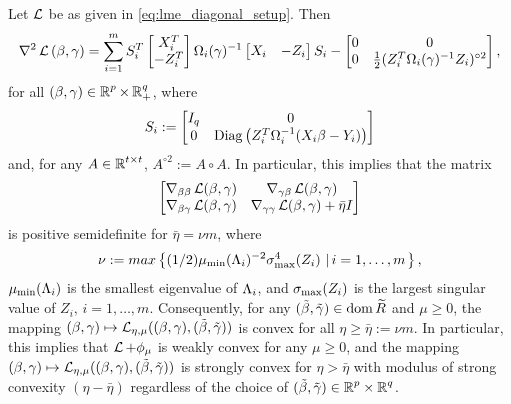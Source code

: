 \begin{lemma}\label{lem:LL weak cvx}
Let $\operatorname{\mathcal{L}}$ be as given in \eqref{eq:lme_diagonal_setup}. Then
\begin{equation}\label{eq:hess LL}
\nabla^2\operatorname{\mathcal{L}}{(\beta,\gamma)}=\sum_{i=1}^m
S_i^T\begin{bmatrix}X_i^T\\ -Z_i^T\end{bmatrix}
\Omega_i(\gamma)^{-1}
\begin{bmatrix}X_i& -Z_i\end{bmatrix}S_i
-\begin{bmatrix}
0&0\\ 0& \frac{1}{2}(Z_i^T\Omega_i(\gamma)^{-1}Z_i)^{\circ2}
\end{bmatrix},
\end{equation}
for all
$(\beta,\gamma)\in\operatorname{\mathbb{R}}^p\times\operatorname{\mathbb{R}}^q_+$, where 
\[
S_i:=\begin{bmatrix}
I_q&0\\ 0&\mathrm{Diag}\left(Z_i^T\Omega_i^{-1}(X_i\beta-Y_i)\right)
\end{bmatrix}
\]
and, for any $A\in\operatorname{\mathbb{R}}^{t\times t}$, $A^{\circ 2}:=A\circ A$. In particular, this implies
that the matrix
\begin{equation}\label{eq:psd for LL}
\begin{bmatrix}
\nabla_{\beta\beta}\operatorname{\mathcal{L}}(\beta,\gamma)&\nabla_{\gamma\beta}\operatorname{\mathcal{L}}(\beta,\gamma)\\
\nabla_{\beta\gamma}\operatorname{\mathcal{L}}(\beta,\gamma)&\nabla_{\gamma\gamma}\operatorname{\mathcal{L}}(\beta,\gamma)
+{\bar\eta} I\end{bmatrix}
\end{equation}
is positive semidefinite
for $\bar\eta= \nu m$, where
\[
\nu:=max\left\{(1/2) \mu_{\text{min}}(\Lambda_i)^{-2}\sigma^4_{\text{max}}(Z_i)\,\left|\,i=1,\dots,m\right.\right\},
\]
$\mu_{\text{min}}(\Lambda_i)$ is the smallest eigenvalue of $\Lambda_i$, and
 $\sigma_{\text{max}}(Z_i)$ is the largest singular value of $Z_i,\, i=1,\dots,m$.
Consequently, for any $(\tilde\beta,{\tilde{\gamma}})\in\operatorname{\mathrm{dom}}{{\widetilde R}}$ and $\mu\ge 0$, the mapping 
\(
(\beta,\gamma)\mapsto \operatorname{\mathcal{L}}_{{\eta,\mu}}((\beta,\gamma), (\tilde\beta,{\tilde{\gamma}}))
\)
is convex for all $\eta\ge\bar\eta:=\nu m$.
In particular, this implies that $\operatorname{\mathcal{L}}+\phi_\mu$ is weakly convex for any $\mu\ge 0$, 
and the mapping
\(
(\beta,\gamma)\mapsto\operatorname{\mathcal{L}}_{{\eta,\mu}}((\beta,\gamma),(\tilde\beta,{\tilde{\gamma}}))
\)
is strongly convex for $\eta> \bar\eta$ with modulus of strong convexity $(\eta-\bar\eta)$
regardless of the choice of $(\tilde\beta,{\tilde{\gamma}})\in{\operatorname{\mathbb{R}}^p}\times{\operatorname{\mathbb{R}}^q}$.
\end{lemma}
